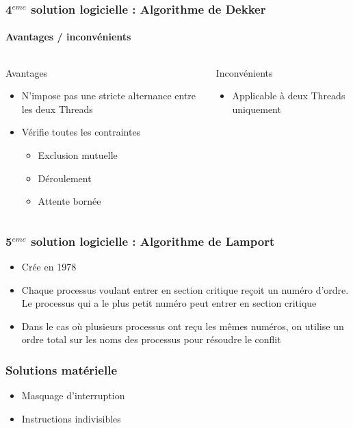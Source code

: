 \begin{frame}
\frametitle{4$^{eme}$ solution logicielle : Algorithme de Dekker}
\framesubtitle{Avantages / inconvénients}

\begin{columns}
\begin{block}{Avantages}
\begin{itemize}
\item N’impose pas une stricte alternance entre les deux Threads
\item Vérifie toutes les contraintes
\begin{itemize}
\item Exclusion mutuelle
\item Déroulement
\item Attente bornée
\end{itemize}
\end{itemize}
\end{block}
\begin{block}{Inconvénients}
\begin{itemize}
\item Applicable à deux Threads uniquement
\end{itemize}
\end{block}
\end{columns}
\end{frame}

\begin{frame}
\frametitle{5$^{eme}$ solution logicielle : Algorithme de Lamport}
\begin{itemize}
\item Crée en 1978
\item Chaque processus voulant entrer en section critique reçoit un numéro d'ordre. Le processus qui a le plus petit numéro peut entrer en section critique
\item Dans le cas où plusieurs processus ont reçu les mêmes numéros, on utilise un ordre total sur les noms des processus pour résoudre le conflit
\end{itemize}
\end{frame}

\begin{frame}
\frametitle{Solutions matérielle}
\begin{itemize}
\item Masquage d’interruption
\item Instructions indivisibles
\end{itemize}
\end{frame}

